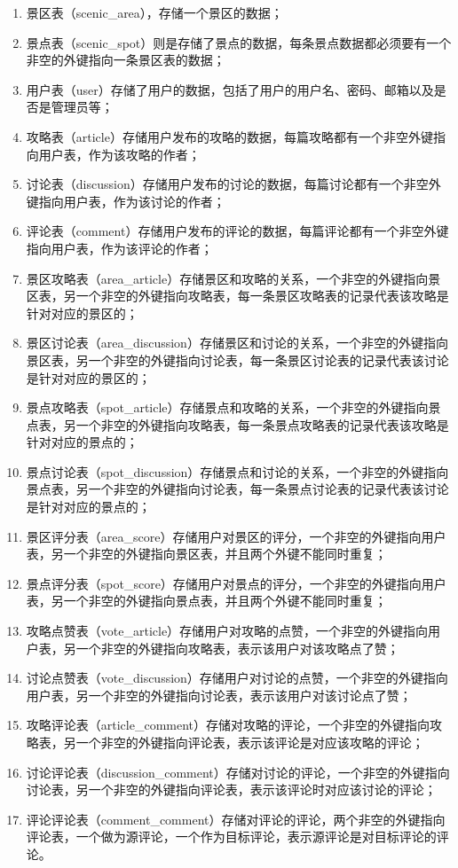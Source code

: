 \begin{enumerate}
                \item 景区表（scenic\_area），存储一个景区的数据；
                \item 景点表（scenic\_spot）则是存储了景点的数据，每条景点数据都必须要有一个非空的外键指向一条景区表的数据；
                \item 用户表（user）存储了用户的数据，包括了用户的用户名、密码、邮箱以及是否是管理员等；
                \item 攻略表（article）存储用户发布的攻略的数据，每篇攻略都有一个非空外键指向用户表，作为该攻略的作者；
                \item 讨论表（discussion）存储用户发布的讨论的数据，每篇讨论都有一个非空外键指向用户表，作为该讨论的作者；
                \item 评论表（comment）存储用户发布的评论的数据，每篇评论都有一个非空外键指向用户表，作为该评论的作者；
                \item 景区攻略表（area\_article）存储景区和攻略的关系，一个非空的外键指向景区表，另一个非空的外键指向攻略表，每一条景区攻略表的记录代表该攻略是针对对应的景区的；
                \item 景区讨论表（area\_discussion）存储景区和讨论的关系，一个非空的外键指向景区表，另一个非空的外键指向讨论表，每一条景区讨论表的记录代表该讨论是针对对应的景区的；
                \item 景点攻略表（spot\_article）存储景点和攻略的关系，一个非空的外键指向景点表，另一个非空的外键指向攻略表，每一条景点攻略表的记录代表该攻略是针对对应的景点的；
                \item 景点讨论表（spot\_discussion）存储景点和讨论的关系，一个非空的外键指向景点表，另一个非空的外键指向讨论表，每一条景点讨论表的记录代表该讨论是针对对应的景点的；
                \item 景区评分表（area\_score）存储用户对景区的评分，一个非空的外键指向用户表，另一个非空的外键指向景区表，并且两个外键不能同时重复；
                \item 景点评分表（spot\_score）存储用户对景点的评分，一个非空的外键指向用户表，另一个非空的外键指向景点表，并且两个外键不能同时重复；
                \item 攻略点赞表（vote\_article）存储用户对攻略的点赞，一个非空的外键指向用户表，另一个非空的外键指向攻略表，表示该用户对该攻略点了赞；
                \item 讨论点赞表（vote\_discussion）存储用户对讨论的点赞，一个非空的外键指向用户表，另一个非空的外键指向讨论表，表示该用户对该讨论点了赞；
                \item 攻略评论表（article\_comment）存储对攻略的评论，一个非空的外键指向攻略表，另一个非空的外键指向评论表，表示该评论是对应该攻略的评论；
                \item 讨论评论表（discussion\_comment）存储对讨论的评论，一个非空的外键指向讨论表，另一个非空的外键指向评论表，表示该评论时对应该讨论的评论；
                \item 评论评论表（comment\_comment）存储对评论的评论，两个非空的外键指向评论表，一个做为源评论，一个作为目标评论，表示源评论是对目标评论的评论。

            \end{enumerate}

